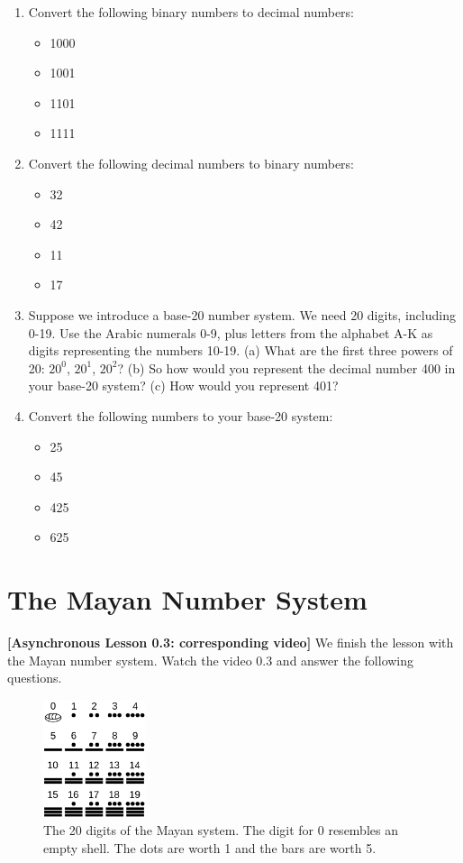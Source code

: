 \documentclass[10pt]{article}
\begin{document}
\begin{enumerate}
\item Convert the following binary numbers to decimal numbers:
\begin{itemize}
\item 1000
\item 1001
\item 1101
\item 1111
\end{itemize}
\item Convert the following decimal numbers to binary numbers:
\begin{itemize}
\item 32
\item 42
\item 11
\item 17
\end{itemize}
\item Suppose we introduce a base-20 number system.  We need 20 digits, including 0-19.  Use the Arabic numerals 0-9, plus letters from the alphabet A-K as digits representing the numbers 10-19.  (a) What are the first three powers of 20: $20^0$, $20^1$, $20^2$? (b) So how would you represent the decimal number 400 in your base-20 system? (c) How would you represent 401? \\ \vspace{2cm}
\item Convert the following numbers to your base-20 system:
\begin{itemize}
\item 25
\item 45
\item 425
\item 625
\end{itemize}
\end{enumerate}

\section{The Mayan Number System}

\textbf{[Asynchronous Lesson 0.3: corresponding video]}  We finish the lesson with the Mayan number system.  Watch the video 0.3 and answer the following questions.

\begin{figure}[hb]
\centering
\includegraphics[width=3cm]{figures/maya_digits.png}
\caption{\label{fig:maya} The 20 digits of the Mayan system.  The digit for 0 resembles an empty shell.  The dots are worth 1 and the bars are worth 5.}
\end{figure}
\end{document}
